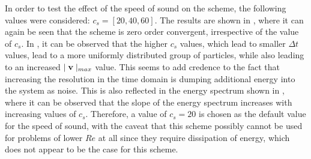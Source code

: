 In order to test the effect of the speed of sound on the scheme, the following values were considered: $c_s = [20, 40, 60]$. The results are shown in , where it can again be seen that the scheme is zero order convergent, irrespective of the value of $c_s$.
In , it can be observed that the higher $c_s$ values, which lead to smaller $\Delta t$ values, lead to a more uniformly distributed group of particles, while also leading to an increased $\mid \mathbf{v} \mid_{max}$ value. This seems to add credence to the fact that increasing the resolution in the time domain is dumping additional energy into the system as noise. This is also reflected in the energy spectrum shown in , where it can be observed that the slope of the energy spectrum increases with increasing values of $c_s$.
Therefore, a value of $c_s = 20$ is chosen as the default value for the speed of sound, with the caveat that this scheme possibly cannot be used for problems of lower $Re$ at all since they require dissipation of energy, which does not appear to be the case for this scheme.

